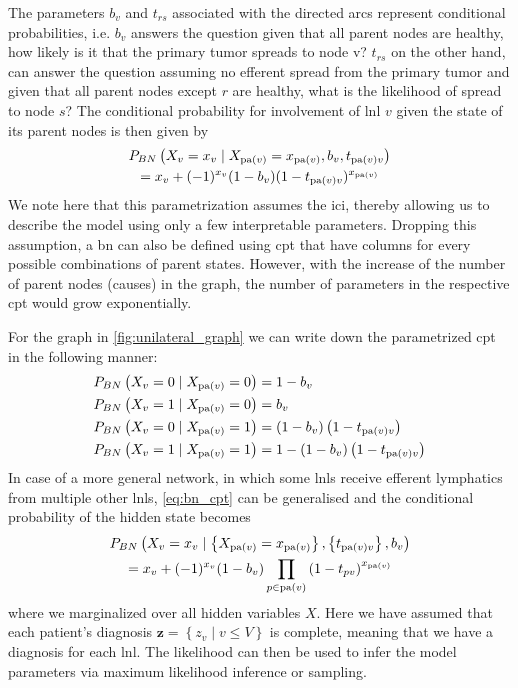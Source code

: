 \documentclass[../ms.tex]{subfiles}
\begin{document}
The parameters $b_v$ and $t_{rs}$   associated with the directed arcs represent conditional probabilities, i.e. $b_v$ answers the question given that all parent nodes are healthy, how likely is it that the primary tumor spreads to node v? $t_{rs}$ on the other hand, can answer the question assuming no efferent spread from the primary tumor and given that all parent nodes except $r$ are healthy, what is the likelihood of spread to node $s$? The conditional probability for involvement of \gls{lnl} $v$ given the state of its parent nodes is then given by
%
\begin{multline}
    P_{BN} \left( X_v = x_v \mid X_{\operatorname{pa}(v)} = x_{\operatorname{pa}(v)}, b_v, t_{\operatorname{pa}(v)v} \right) \\
    = x_v + (-1)^{x_v} (1 - b_v) (1 - t_{\operatorname{pa}(v)v})^{x_{\operatorname{pa}(v)}}
\end{multline}
%
We note here that this parametrization assumes the \gls{ici}, thereby allowing us to describe the model using only a few interpretable parameters. Dropping this assumption, a \gls{bn} can also be defined using \gls{cpt} that have columns for every possible combinations of parent states. However, with the increase of the number of parent nodes (causes) in the graph, the number of parameters in the respective \gls{cpt} would grow exponentially.

For the graph in \cref{fig:unilateral_graph} we can write down the parametrized \gls{cpt} in the following manner:
%
\begin{equation} \label{eq:bn_cpt}
    \begin{aligned}
        P_{BN} \left( X_v = 0 \mid X_{\operatorname{pa}(v)} = 0 \right) &= 1 - b_v \\
        P_{BN} \left( X_v = 1 \mid X_{\operatorname{pa}(v)} = 0 \right) &= b_v \\
        P_{BN} \left( X_v = 0 \mid X_{\operatorname{pa}(v)} = 1 \right) &= (1 - b_v) \left(1 - t_{\operatorname{pa}(v)v}\right) \\
        P_{BN} \left( X_v = 1 \mid X_{\operatorname{pa}(v)} = 1 \right) &= 1 - (1 - b_v) \left(1 - t_{\operatorname{pa}(v)v}\right) 
    \end{aligned}
\end{equation}
%
In case of a more general network, in which some \glspl{lnl} receive efferent lymphatics from multiple other \glspl{lnl}, \cref{eq:bn_cpt} can be generalised and the conditional probability of the hidden state becomes
%
\begin{multline}
    P_{BN} \left( X_v = x_v \mid \left\{ X_{\operatorname{pa}(v)} = x_{\operatorname{pa}(v)} \right\}, \left\{ t_{\operatorname{pa}(v)v} \right\} , b_v \right) \\
    = x_v + (-1)^{x_v} (1 - b_v) \prod_{p \in \operatorname{pa}(v)}{\left( 1 - t_{pv} \right)}^{x_{\operatorname{pa}(v)}}
\end{multline}
%
where we marginalized over all hidden variables $X$. Here we have assumed that each patient's diagnosis $\mathbf{z} = \left\{ z_v \mid v \leq V \right\}$ is complete, meaning that we have a diagnosis for each \gls{lnl}. The likelihood can then be used to infer the model parameters via maximum likelihood inference or sampling.
\end{document}
